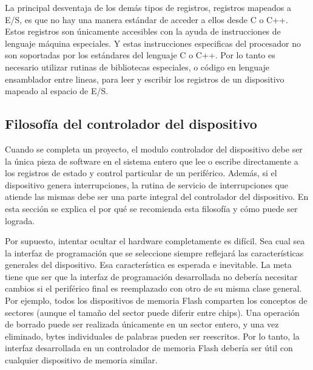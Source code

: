 \documentclass[12pt]{article}
\begin{document}
La principal desventaja de los demás tipos de registros, registros mapeados
a E/S, es que no hay una manera estándar de acceder a ellos desde C o C++. 
Estos registros son únicamente accesibles con la ayuda de instrucciones
de lenguaje máquina especiales. Y estas instrucciones especificas del procesador
no son soportadas por los estándares del lenguaje C o C++. Por lo tanto
es necesario utilizar rutinas de bibliotecas especiales, o código en lenguaje
ensamblador entre lineas, para leer y escribir los registros de un
dispositivo mapeado al espacio de E/S.


\subsection *{Filosofía del controlador del dispositivo}


Cuando se completa un proyecto, el modulo controlador del dispositivo debe 
ser la única
pieza de software en el sistema entero que lee o escribe directamente a los 
registros de estado y control particular de un periférico. Además, si el 
dispositivo 
genera interrupciones, la rutina de servicio de interrupciones que 
atiende las mismas debe ser una parte integral del controlador del dispositivo.
En esta sección se explica el por qué se recomienda esta filosofía y cómo
puede ser lograda.

Por supuesto, intentar ocultar el hardware completamente es difícil. Sea cual
sea la interfaz de programación que se seleccione siempre reflejará las
características generales del dispositivo. Esa característica es esperada
e inevitable. La meta tiene que ser que la interfaz de programación
desarrollada no debería necesitar cambios si el periférico final es reemplazado
con otro de su misma clase general. Por ejemplo, todos los dispositivos de memoria
Flash comparten los conceptos de sectores (aunque el tamaño del sector
puede diferir entre chips). Una operación de borrado puede ser realizada
únicamente en un sector entero, y una vez eliminado, bytes individuales
de palabras pueden ser reescritos. Por lo tanto, la interfaz desarrollada
en un controlador de memoria Flash debería ser útil con cualquier
dispositivo de memoria similar.
\end{document}
